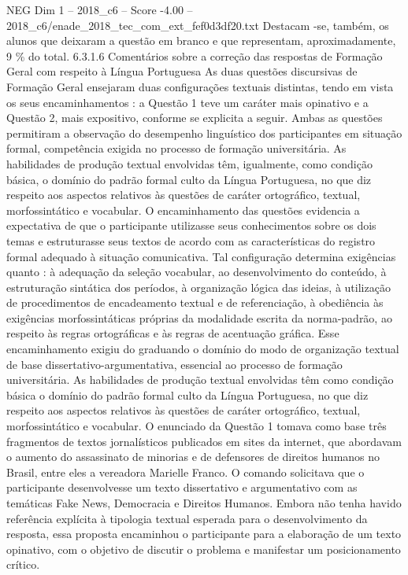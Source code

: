 \begin{textsample}{NEG Dim 1 – 2018\_c6 – Score -4.00 – 2018\_c6/enade\_2018\_tec\_com\_ext\_fef0d3df20.txt}
Destacam -se, também, os alunos que deixaram a questão em branco e que representam, aproximadamente, 9 \% do total. 6.3.1.6 Comentários sobre a correção das respostas de Formação Geral com respeito à Língua Portuguesa As duas questões discursivas de Formação Geral ensejaram duas configurações textuais distintas, tendo em vista os seus encaminhamentos : a Questão 1 teve um caráter mais opinativo e a Questão 2, mais expositivo, conforme se explicita a seguir.
Ambas as questões permitiram a observação do desempenho linguístico dos participantes em situação formal, competência exigida no processo de formação universitária.
As habilidades de produção textual envolvidas têm, igualmente, como condição básica, o domínio do padrão formal culto da Língua Portuguesa, no que diz respeito aos aspectos relativos às questões de caráter ortográfico, textual, morfossintático e vocabular.
O encaminhamento das questões evidencia a expectativa de que o participante utilizasse seus conhecimentos sobre os dois temas e estruturasse seus textos de acordo com as características do registro formal adequado à situação comunicativa.
Tal configuração determina exigências quanto : à adequação da seleção vocabular, ao desenvolvimento do conteúdo, à estruturação sintática dos períodos, à organização lógica das ideias, à utilização de procedimentos de encadeamento textual e de referenciação, à obediência às exigências morfossintáticas próprias da modalidade escrita da norma-padrão, ao respeito às regras ortográficas e às regras de acentuação gráfica.
Esse encaminhamento exigiu do graduando o domínio do modo de organização textual de base dissertativo-argumentativa, essencial ao processo de formação universitária.
As habilidades de produção textual envolvidas têm como condição básica o domínio do padrão formal culto da Língua Portuguesa, no que diz respeito aos aspectos relativos às questões de caráter ortográfico, textual, morfossintático e vocabular.
O enunciado da Questão 1 tomava como base três fragmentos de textos jornalísticos publicados em sites da internet, que abordavam o aumento do assassinato de minorias e de defensores de direitos humanos no Brasil, entre eles a vereadora Marielle Franco.
O comando solicitava que o participante desenvolvesse um texto dissertativo e argumentativo com as temáticas Fake News, Democracia e Direitos Humanos.
Embora não tenha havido referência explícita à tipologia textual esperada para o desenvolvimento da resposta, essa proposta encaminhou o participante para a elaboração de um texto opinativo, com o objetivo de discutir o problema e manifestar um posicionamento crítico.

\end{textsample}
